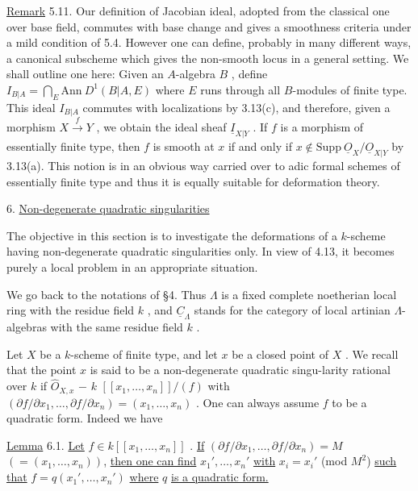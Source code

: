 \underline{Remark} 5.11.  Our definition of Jacobian ideal, adopted from the classical one over base field, commutes with base change and gives a smoothness criteria under a mild condition of 5.4. However one can define, probably in many different ways, a canonical subscheme which gives the non-smooth locus in a general setting. We shall outline one here:  Given an $A$-algebra  $B$  , define  $I_{B|A} = \bigcap_E \mathrm{Ann}\ D^1(B|A,E)$ where  $E$  runs through all  $B$-modules of finite type. This ideal  $I_{B|A}$  commutes with localizations by 3.13(c), and therefore, given a morphism  $X \xrightarrow{\ f\ } Y$  , we obtain the ideal sheaf  $\underline{I}_{X|Y}$  . If  $f$  is a morphism of essentially finite type, then  $f$  is smooth at  $x$  if and only if  $x \notin \mathrm{Supp}\ \underline{O}_X/\underline{O}_{X|Y}$  by 3.13(a). This notion is in an obvious way carried over to adic formal schemes of essentially
finite type and thus it is equally suitable for deformation theory.


6.  \underline{Non-degenerate quadratic singularities}

The objective in this section is to investigate the deformations of a $k$-scheme having non-degenerate quadratic singularities only. In view of 4.13, it becomes purely a local problem in an appropriate situation.

We go back to the notations of  §4. Thus  $\Lambda$  is a fixed complete noetherian local ring with the residue field  $k$  , and  $\underline{C}_\Lambda$  stands for the category of local artinian $\Lambda$-algebras with the same residue field  $k$  .

Let  $X$  be a $k$-scheme of finite type, and let  $x$  be a closed point of $X$  . We recall that the point  $x$  is said to be a non-degenerate quadratic singu-larity rational over  $k$  if  $\hat{O}_{X,x}$ $-$ $k$ $[[x_1,\ldots,x_n]]/(f)$  with $(\partial f/\partial x_1,\ldots,\partial f/\partial x_n) = (x_1,\ldots,x_n)$  . One  can always assume  $f$  to be a quadratic form. Indeed we have

\underline{Lemma} 6.1.  \underline{Let}  $f \in k[[x_1,\ldots,x_n]]$  . \underline{If}  $(\partial f/\partial x_1,\ldots,\partial f/\partial x_n) = M$  $(= (x_1,\ldots,x_n))$, \underline{then one can find}  $x_1',\ldots,x_n'$  \underline{with}  $x_i = x_i'$  (mod $M^2$)  \underline{such that} $f = q(x_1',\ldots,x_n')$  \underline{where}  $q$  \underline{is a quadratic form.}

